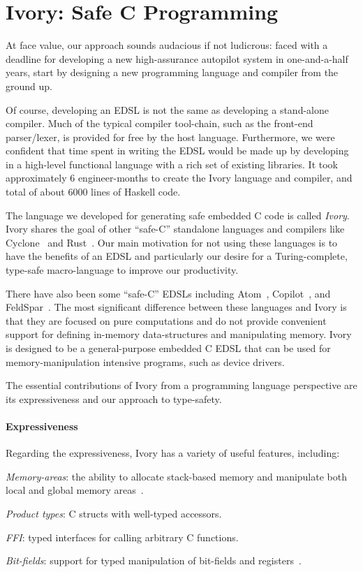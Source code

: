 \section{Ivory: Safe C Programming}
\label{sec:ivory}

At face value, our approach sounds audacious if not ludicrous: faced with a
deadline for developing a new high-assurance autopilot system in one-and-a-half
years, start by designing a new programming language and compiler from the
ground up.

Of course, developing an EDSL is not the same as developing a stand-alone
compiler.  Much of the typical compiler tool-chain, such as the front-end
parser/lexer, is provided for free by the host language.  Furthermore, we were
confident that time spent in writing the EDSL would be made up by developing in
a high-level functional language with a rich set of existing libraries. It took
approximately 6 engineer-months to create the Ivory language and compiler, and
total of about 6000 lines of Haskell code.

The language we developed for generating safe embedded C code is called
\emph{Ivory}.  Ivory shares the goal of other ``safe-C'' standalone languages
and compilers like Cyclone~\cite{cyclone} and Rust~\cite{rust}.  Our main
motivation for not using these languages is to have the benefits of an EDSL and
particularly our desire for a Turing-complete, type-safe macro-language to
improve our productivity.

There have also been some ``safe-C'' EDSLs including Atom~\cite{atom},
Copilot~\cite{copilot}, and FeldSpar~\cite{feldspar1}.  The most significant
difference between these languages and Ivory is that they are focused on pure
computations and do not provide convenient support for defining in-memory
data-structures and manipulating memory.  Ivory is designed to be a
general-purpose embedded C EDSL that can be used for memory-manipulation
intensive programs, such as device drivers.

The essential contributions of Ivory from a programming language perspective are
its expressiveness and our approach to type-safety.

\paragraph{Expressiveness}
Regarding the expressiveness, Ivory has a variety of useful features, including:
\begin{compactitem}
  \item \emph{Memory-areas}: the ability to allocate stack-based memory and
    manipulate both local and global memory areas~\cite{memareas}.
  \item \emph{Product types}: C structs with well-typed accessors.
  \item \emph{FFI}: typed interfaces for calling arbitrary C functions.
  \item \emph{Bit-fields}: support for typed manipulation of bit-fields and
    registers~\cite{high-level}.
\end{compactitem}

